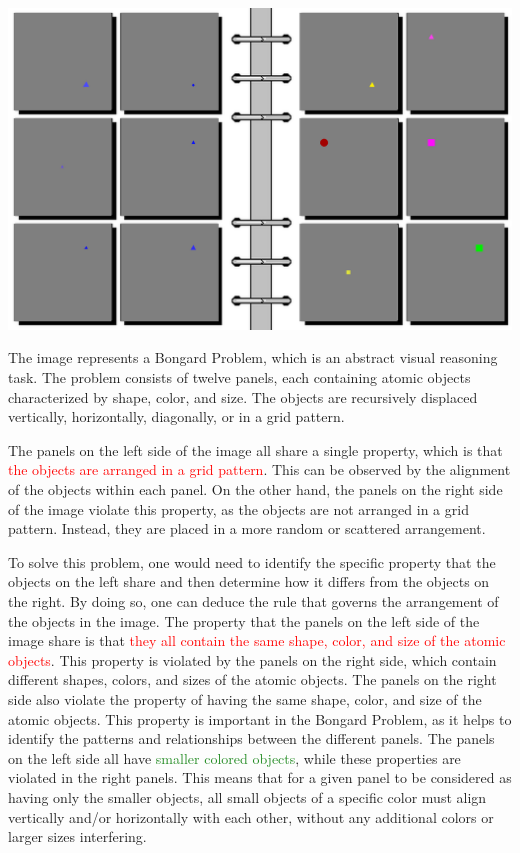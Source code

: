 \begin{tcolorbox}[breakable,enhanced jigsaw,opacityback=0,]
	\centering
	\includegraphics[width=.8\linewidth]{imgs/bongard/easy-5.png}\\
	\begin{dialogue}
		 The image represents a Bongard Problem, which is an abstract visual reasoning task. The problem consists of twelve panels, each containing atomic objects characterized by shape, color, and size. The objects are recursively displaced vertically, horizontally, diagonally, or in a grid pattern.
		
		The panels on the left side of the image all share a single property, which is that \textcolor{red}{the objects are arranged in a grid pattern}. This can be observed by the alignment of the objects within each panel. On the other hand, the panels on the right side of the image violate this property, as the objects are not arranged in a grid pattern. Instead, they are placed in a more random or scattered arrangement.
		
		To solve this problem, one would need to identify the specific property that the objects on the left share and then determine how it differs from the objects on the right. By doing so, one can deduce the rule that governs the arrangement of the objects in the image.
		\vspace{1em}
		 The property that the panels on the left side of the image share is that \textcolor{red}{they all contain the same shape, color, and size of the atomic objects}. This property is violated by the panels on the right side, which contain different shapes, colors, and sizes of the atomic objects. The panels on the right side also violate the property of having the same shape, color, and size of the atomic objects. This property is important in the Bongard Problem, as it helps to identify the patterns and relationships between the different panels.
		\vspace{1em}
		 The panels on the left side all have \textcolor{ForestGreen}{smaller colored objects}, while these properties are violated in the right panels. This means that for a given panel to be considered as having only the smaller objects, all small objects of a specific color must align vertically and/or horizontally with each other, without any additional colors or larger sizes interfering.
		

\end{dialogue}
\end{tcolorbox}
